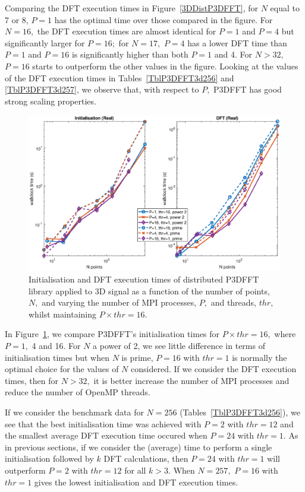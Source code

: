\documentclass[a4paper]{article}
\begin{document}
Comparing the DFT execution times in Figure~\ref{3DDistP3DFFT}, for
$N$ equal to 7 or 8, $P=1$ has the optimal time over those compared in
the figure. For $N=16,$ the DFT execution times are almost identical
for $P=1$ and $P=4$ but significantly larger for $P=16;$ for $N=17,$
$P=4$ has a lower DFT time than $P=1$ and $P=16$ is significantly
higher than both $P=1$ and 4. For $N>32,$ $P=16$ starts to outperform
the other values in the figure. Looking at the values of the DFT
execution times in Tables~\ref{TblP3DFFT3d256} and
\ref{TblP3DFFT3d257}, we observe that, with respect to $P,$ P3DFFT
has good strong scaling properties.

\begin{figure}[htb]
    \centering
    \includegraphics[width=0.9\linewidth]{../results/p3dfft_3d_mpi_thr.eps}
  \caption{Initialisation and DFT execution times of distributed P3DFFT library applied to 3D signal as a function of the
    number of points, $N,$ and varying the number of MPI processes, $P,$ and threads, $thr,$ whilst maintaining $P\times thr=16.$}
  \label{3DDistP3DFFT16}
\end{figure}

In Figure~\ref{3DDistP3DFFT16}, we compare P3DFFT's initialisation
times for $P\times thr=16,$ where $P=1,$ 4 and 16. For $N$ a power of
2, we see little difference in terms of initialisation times but when
$N$ is prime, $P=16$ with $thr=1$ is normally the optimal choice for
the values of $N$ considered. If we consider the DFT execution times,
then for $N>32,$ it is better increase the number of MPI processes and
reduce the number of OpenMP threads.

If we consider the benchmark data for $N=256$
(Tables~\ref{TblP3DFFT3d256}), we see that the best initialisation
time was achieved with $P=2$ with $thr=12$ and the smallest average
DFT execution time occured when $P=24$ with $thr=1.$ As in previous
sections, if we consider the (average) time to perform a single
initialisation followed by $k$ DFT calculations, then $P=24$ with
$thr=1$ will outperform $P=2$ with $thr=12$ for all $k>3.$ When
$N=257,$ $P=16$ with $thr=1$ gives the lowest initialisation and DFT
execution times.
\end{document}
